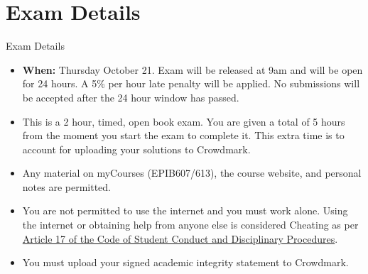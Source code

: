 \documentclass[10pt]{beamer}\usepackage[]{graphicx}\usepackage[]{color}
\begin{document}
\section{Exam Details}
\begin{frame}{Exam Details}
	
	\begin{itemize}
		\setlength\itemsep{.51em}
		\item \textbf{When:} Thursday October 21. Exam will be released at 9am and will be open for 24 hours. A 5\% per hour late penalty will be applied. No submissions will be accepted after the 24 hour window has passed. 
		
		\item This is a 2 hour, timed, open book exam.  You are given a total of 5 hours from the moment you start the exam to complete it. This extra time is to account for uploading your solutions to Crowdmark. 
		
		\item Any material on myCourses (EPIB607/613), the course website, and personal notes are permitted.
		
		\item You are not permitted to use the internet and you must work alone. Using the internet or obtaining help from anyone else is considered Cheating as per \href{https://www.mcgill.ca/students/srr/academicrights/integrity/cheating}{Article 17 of the Code of Student Conduct and Disciplinary Procedures}. 

		\item You must upload your signed academic integrity statement to Crowdmark. 
		
		
	\end{itemize}
	
\end{frame}
\end{document}
